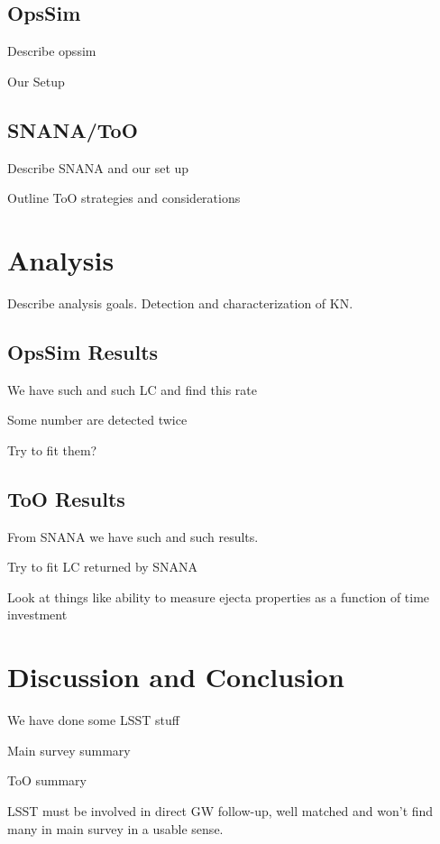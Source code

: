 \subsection{OpsSim}
\label{sec:ch6_opssim}
Describe opssim

Our Setup

\subsection{SNANA/ToO}
\label{sec:ch6_snana}
Describe SNANA and our set up

Outline ToO strategies and considerations

\section{Analysis}
\label{sec:ch6_analysis}
Describe analysis goals. Detection and characterization of KN. 

\subsection{OpsSim Results}
\label{sec:ch6_opssim_results}
We have such and such LC and find this rate

Some number are detected twice

Try to fit them?

\subsection{ToO Results}
\label{sec:ch6_too_results}
From SNANA we have such and such results.

Try to fit LC returned by SNANA

Look at things like ability to measure ejecta properties as a function of time investment

\section{Discussion and Conclusion}
\label{sec:ch6_conc}
We have done some LSST stuff 

Main survey summary

ToO summary

LSST must be involved in direct GW follow-up, well matched and won't find many in main survey in a usable sense.

